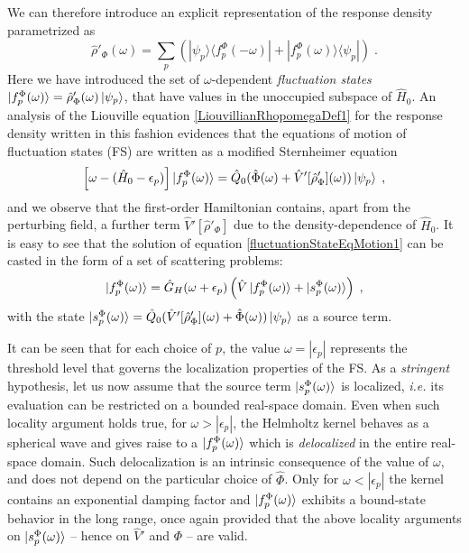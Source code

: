 \documentclass[reprint,aps,prb]{revtex4-1}
\newcommand{\eps}{\epsilon}
\newcommand{\be}{\begin{equation}}
\newcommand{\ee}{\end{equation}}
\newcommand{\lb}{\label}
\newcommand{\op}[1]{\hat {#1}}
\newcommand{\ketbra}[2]{| #1 \rangle \langle #2 |}
\newcommand{\dm}{\op{\rho}}
\newcommand{\hnot}{\op{H}_0}
\begin{document}
We can therefore introduce an explicit representation of the 
response density parametrized as
\be\lb{rhoPrimeFluctuationStateDef1}
\dm'_\Phi(\omega) = \sum_p\left(\ketbra{\psi_p}{f_p^\Phi(-\omega)} + \ketbra{f_p^\Phi(\omega)}{\psi_p}\right) \;.
\ee
Here we have introduced the set of $\omega$-dependent \emph{fluctuation states} 
$\ket{f_p^\Phi(\omega)} = \dm'_\Phi(\omega) \ket{\psi_p}$, that have values in the unoccupied subspace of $\hnot$. 
An analysis of the Liouville equation \eqref{LiouvillianRhopomegaDef1} for the response density written in this fashion evidences that the equations of motion of fluctuation states (FS) are 
written as a modified Sternheimer equation~\cite{mahan1980,giustino2012,giustino2014}
\be\lb{fluctuationStateEqMotion1}
\left[\omega - (\hnot-\eps_p)\right]\ket{f_p^\Phi(\omega)} = \op Q_0(\op\Phi(\omega)+\op V'[\dm'_\Phi](\omega))\ket{\psi_p} \;,
\ee
and we observe that the first-order Hamiltonian contains, 
apart from the perturbing field, a further term $\op V'[\dm'_\Phi]$ due to the density-dependence of $\hnot$.
It is easy to see that the solution of equation \eqref{fluctuationStateEqMotion1} can be casted in the form of
a set of scattering problems:
\be\lb{rhoPrimeFluctuationStateDef2}
\ket{f_p^\Phi(\omega)} = \op G_H(\omega+\epsilon_p)\left(\op V\ket{f_p^\Phi(\omega)} + \ket{s_p^\Phi(\omega)} \right)\;,
\ee
with the state
$
\ket{s_p^\Phi(\omega)} = \op Q_0(\op V'[\dm'_\Phi](\omega) + \op \Phi(\omega))\ket{\psi_p} 
$ as a source term. 

It can be seen that for each choice of $p$, the value $\omega = |\eps_p|$ represents the threshold level 
that governs the localization properties of the FS.
As a \emph{stringent} hypothesis, let us now assume that the source term $\ket{s_p^\Phi(\omega)}$ is localized, \textit{i.e.} its evaluation can be
restricted on a bounded real-space domain.
Even when such locality argument holds true, for $\omega > |\eps_p|$, 
the Helmholtz kernel behaves as a spherical wave and  gives raise to a $\ket{f^\Phi_p(\omega)}$ which is \emph{delocalized} in the entire real-space domain.
Such delocalization is an intrinsic consequence of the value of $\omega$, and does not depend on the particular choice of 
$\op \Phi$.
Only for $\omega < |\eps_p|$ the kernel contains an exponential damping factor and $\ket{f^\Phi_p(\omega)}$ exhibits a bound-state behavior in the long range, 
once again provided that the above locality arguments on $\ket{s_p^\Phi(\omega)}$ -- hence on $\op V'$ and $\Phi$ -- are valid.
\end{document}
